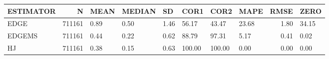 \begin{table}[ht]
\centering
\begin{tabular}{lrllllllrl}
  \hline
ESTIMATOR & N & MEAN & MEDIAN & SD & COR1 & COR2 & MAPE & RMSE & ZERO \\ 
  \hline
EDGE & 711161 & 0.89 & 0.50 & 1.46 & 56.17 & 43.47 & 23.68 & 1.80 & 34.15 \\ 
  EDGEMS & 711161 & 0.44 & 0.22 & 0.62 & 88.79 & 97.31 & 5.17 & 0.41 & 0.02 \\ 
  HJ & 711161 & 0.38 & 0.15 & 0.63 & 100.00 & 100.00 & 0.00 & 0.00 & 0.00 \\ 
   \hline
\end{tabular}
\end{table}
